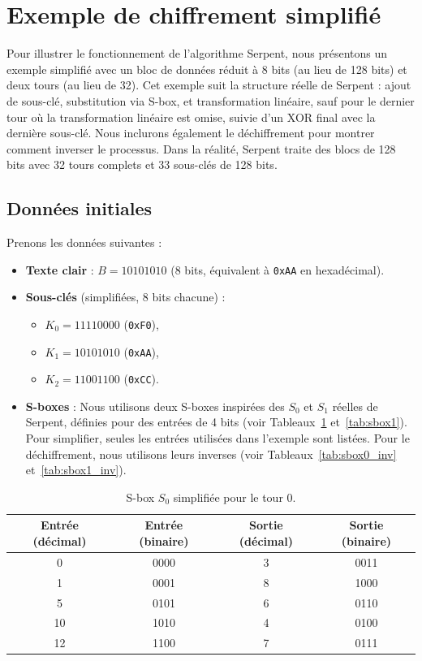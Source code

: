 \documentclass[12pt,a4paper]{report}
\begin{document}
\section*{Exemple de chiffrement simplifié}

Pour illustrer le fonctionnement de l'algorithme Serpent, nous présentons un exemple simplifié avec un bloc de données réduit à 8 bits (au lieu de 128 bits) et deux tours (au lieu de 32). Cet exemple suit la structure réelle de Serpent : ajout de sous-clé, substitution via S-box, et transformation linéaire, sauf pour le dernier tour où la transformation linéaire est omise, suivie d'un XOR final avec la dernière sous-clé. Nous inclurons également le déchiffrement pour montrer comment inverser le processus. Dans la réalité, Serpent traite des blocs de 128 bits avec 32 tours complets et 33 sous-clés de 128 bits.

\subsection{Données initiales}
Prenons les données suivantes :
\begin{itemize}
    \item \textbf{Texte clair} : \( B = 10101010 \) (8 bits, équivalent à \texttt{0xAA} en hexadécimal).
    \item \textbf{Sous-clés} (simplifiées, 8 bits chacune) :
    \begin{itemize}
        \item \( K_0 = 11110000 \) (\texttt{0xF0}),
        \item \( K_1 = 10101010 \) (\texttt{0xAA}),
        \item \( K_2 = 11001100 \) (\texttt{0xCC}).
    \end{itemize}
    \item \textbf{S-boxes} : Nous utilisons deux S-boxes inspirées des \( S_0 \) et \( S_1 \) réelles de Serpent, définies pour des entrées de 4 bits (voir Tableaux~\ref{tab:sbox0} et~\ref{tab:sbox1}). Pour simplifier, seules les entrées utilisées dans l'exemple sont listées. Pour le déchiffrement, nous utilisons leurs inverses (voir Tableaux~\ref{tab:sbox0_inv} et~\ref{tab:sbox1_inv}).
\end{itemize}

\begin{table}[h]
    \centering
    \begin{tabular}{|c|c|c|c|}
        \hline
        Entrée (décimal) & Entrée (binaire) & Sortie (décimal) & Sortie (binaire) \\
        \hline
        0 & 0000 & 3 & 0011 \\
        1 & 0001 & 8 & 1000 \\
        5 & 0101 & 6 & 0110 \\
        10 & 1010 & 4 & 0100 \\
        12 & 1100 & 7 & 0111 \\
        \hline
    \end{tabular}
    \caption{S-box \( S_0 \) simplifiée pour le tour 0.}
    \label{tab:sbox0}
\end{table}
\end{document}
